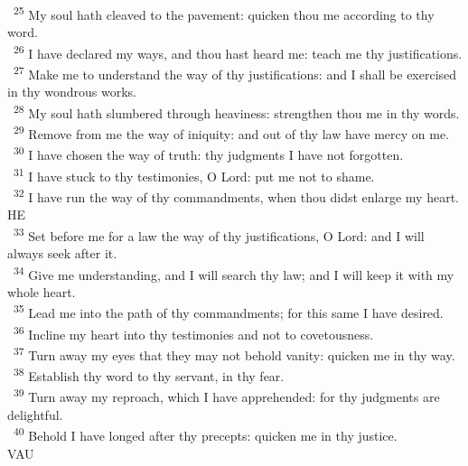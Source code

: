 \documentclass[a5paper,12pt]{article}
\begin{document}
\begin{multicols*}{2}
~\textsuperscript{25} My soul hath cleaved to the pavement: quicken thou me according to thy word.\\
~\textsuperscript{26} I have declared my ways, and thou hast heard me: teach me thy justifications.\\
~\textsuperscript{27} Make me to understand the way of thy justifications: and I shall be exercised in thy wondrous works.\\
~\textsuperscript{28} My soul hath slumbered through heaviness: strengthen thou me in thy words.\\
~\textsuperscript{29} Remove from me the way of iniquity: and out of thy law have mercy on me.\\
~\textsuperscript{30} I have chosen the way of truth: thy judgments I have not forgotten.\\
~\textsuperscript{31} I have stuck to thy testimonies, O Lord: put me not to shame.\\
~\textsuperscript{32} I have run the way of thy commandments, when thou didst enlarge my heart.\\

HE\\

~\textsuperscript{33} Set before me for a law the way of thy justifications, O Lord: and I will always seek after it.\\
~\textsuperscript{34} Give me understanding, and I will search thy law; and I will keep it with my whole heart.\\
~\textsuperscript{35} Lead me into the path of thy commandments; for this same I have desired.\\
~\textsuperscript{36} Incline my heart into thy testimonies and not to covetousness.\\
~\textsuperscript{37} Turn away my eyes that they may not behold vanity: quicken me in thy way.\\
~\textsuperscript{38} Establish thy word to thy servant, in thy fear.\\
~\textsuperscript{39} Turn away my reproach, which I have apprehended: for thy judgments are delightful.\\
~\textsuperscript{40} Behold I have longed after thy precepts: quicken me in thy justice.\\

VAU\\


\end{multicols*}
\end{document}
